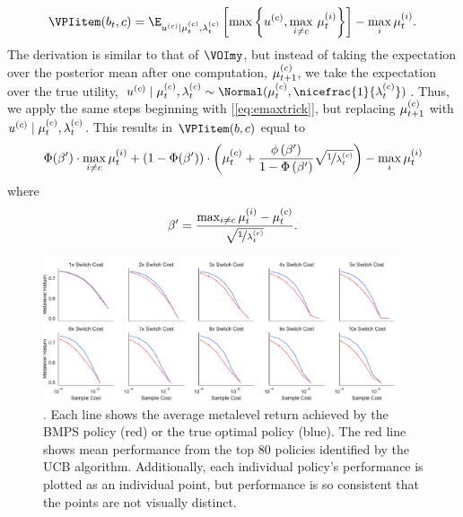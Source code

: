 \begin{equation*}
  \VPIitem(b_t,c)=\E_{u^{(c)} \mid \currentmean, \currentlam} \left[
    \max \left\{ u^{(c)},\max_{i\neq c}\,\mu_t^{(i)} \right\}
  \right] -\max_{i}\mu_t^{(i)}.
\end{equation*}
%
The derivation is similar to that of $\VOImy$, but instead of taking the expectation over the posterior mean after one computation, $\mu_{t+1}^{(c)}$, we take the expectation over the true utility, $u^{(c)} \mid \currentmean, \currentlam \sim \Normal(\currentmean,\nicefrac{1}{\currentlam})$. Thus, we apply the same steps beginning with [\ref{eq:emaxtrick}], but replacing $\mu_{t+1}^{(c)}$ with $u^{(c)} \mid \mu_{t}^{(c)}, \lambda_{t}^{(c)}$. This results in $\VPIitem(b, c)$ equal to
%
%
\begin{equation*}
  \Phi(\beta')\cdot\max_{i\neq c}\mu_t^{(i)}+\left(1-\Phi(\beta')\right)\cdot\left(\mu_{t}^{(c)}+\frac{\phi\left(\beta'\right)}{1-\Phi\left(\beta'\right)}
  \sqrt{\nicefrac{1}{\lambda_{t}^{(c)}}}\right)
  - \max_{i}\mu_t^{(i)}
\end{equation*}
%
where 
%
\begin{equation*}
  \beta'=\frac{\max_{i\neq c}\mu_t^{(i)}-\mu_{t}^{(c)}}{\sqrt{\nicefrac{1}{\lambda_{t}^{(c)}}}}.
\end{equation*}
%


\begin{figure}[b!]
  
  \centering
  \includegraphics[width=0.95\textwidth]{figs/attention/supp-bernoulli.pdf}
  \caption{.
    Each line shows the average metalevel return achieved by the BMPS policy (red) or the true optimal policy (blue). The red line shows mean performance from the top 80 policies identified by the UCB algorithm. Additionally, each individual policy's performance is plotted as an individual point, but performance is so consistent that the points are not visually distinct.}
  \label{fig:attention-bernoulli}
  
\end{figure}  %

